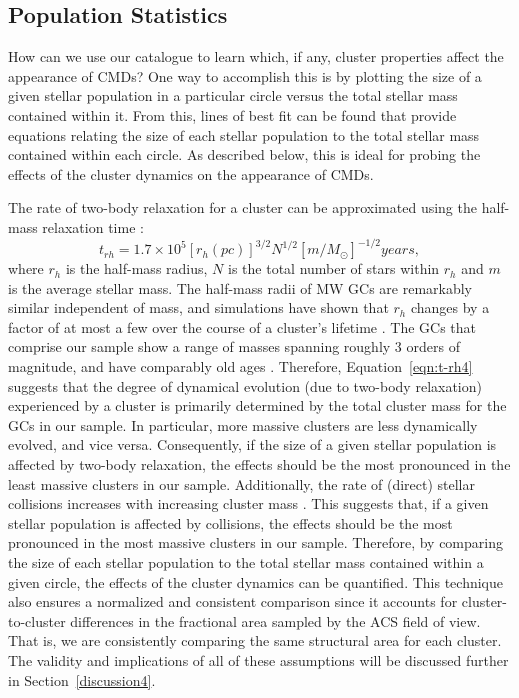 \clearpage

\subsection{Population Statistics} \label{statistics4}

How can we use our catalogue to learn which, if any, 
cluster properties affect the appearance of CMDs?
One way to accomplish this is by plotting the size of a
given stellar population in a particular circle versus the total stellar
mass contained within it.  From this, lines of best fit can be found
that provide equations relating the size of each stellar population to 
the total stellar mass contained within each circle.  As described
below, this is ideal for probing the effects of the cluster dynamics
on the appearance of CMDs.  

The rate of two-body relaxation for a cluster can be approximated
using the half-mass relaxation time \citep{spitzer87}:
\begin{equation}
\label{eqn:t-rh4}
t_{rh} = 1.7 \times 10^5[r_h(pc)]^{3/2}N^{1/2}[m/M_{\odot}]^{-1/2} years,
\end{equation}
where $r_h$ is the half-mass radius, $N$ is the total number of stars
within $r_h$ and $m$ is the average stellar mass.  
The half-mass radii of MW GCs are remarkably similar independent of mass,
and simulations have shown that $r_h$ changes by a factor of at most a few
over the course of a cluster's lifetime \citep{murray09, henon73}.  
The GCs that comprise our sample show a range of masses spanning roughly 3
orders of magnitude, and have comparably old ages \citep{deangeli05}.
Therefore, Equation~\ref{eqn:t-rh4} suggests that the degree of
dynamical evolution (due to two-body relaxation) experienced by a
cluster is primarily determined by the total cluster mass for the 
GCs in our sample.  In particular, more massive clusters are less
dynamically evolved, and vice versa.  Consequently, if the size of a
given stellar population is affected by two-body relaxation, the
effects should be the most pronounced in the least massive clusters in
our sample.  
Additionally, the rate of (direct) stellar collisions increases 
with increasing cluster mass \citep[e.g.][]{davies04}.  This suggests
that, if a given stellar population is affected by collisions, the
effects should be the most pronounced in the most massive clusters in
our sample.  Therefore, by comparing the size of each stellar population
to the total stellar mass contained within a given circle, the 
effects of the cluster dynamics can be quantified.  
This technique also ensures a normalized and consistent comparison
since it accounts for cluster-to-cluster
differences in the fractional area sampled by the ACS field of view.
That is, we are consistently comparing the same
structural area for each cluster.  The validity and implications of
all of these assumptions will be discussed further in
Section~\ref{discussion4}. 

